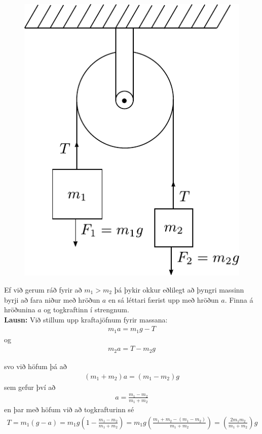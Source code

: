 \ifdefined \wholebook \else\documentclass[oneside]{book}\usepackage{EdlBook}\graphicspath{{figures/}}
\begin{document}
\begin{figure}[H]
    \centering
    \includegraphics[scale = 0.7]{figures/atwood.pdf}
\end{figure}

Ef við gerum ráð fyrir að $m_1 > m_2$ þá þykir okkur eðlilegt að þyngri massinn byrji að fara niður með hröðun $a$ en sá léttari færist upp með hröðun $a$. Finna á hröðunina $a$ og togkraftinn í strengnum. \\

\textbf{Lausn:} Við stillum upp kraftajöfnum fyrir massana:
\begin{align*}
    m_1 a = m_1 g - T
\end{align*}
og
\begin{align*}
    m_2 a = T - m_2 g
\end{align*}

svo við höfum þá að
\begin{align*}
    (m_1 + m_2)a = (m_1 - m_2)g
\end{align*}
sem gefur því að 
\begin{align*}
    a = \frac{m_1 - m_2}{m_1 + m_2}
\end{align*}
en þar með höfum við að togkrafturinn sé
\begin{align*}
    T = m_1 (g-a) = m_1 g \left( 1-  \frac{m_1 - m_2}{m_1 + m_2} \right) = m_1 g \left( \frac{m_1 + m_2 - (m_1 - m_2)}{m_1 + m_2} \right) = \left(\frac{2m_1 m_2}{m_1 + m_2}\right) g
\end{align*}
\end{document}
